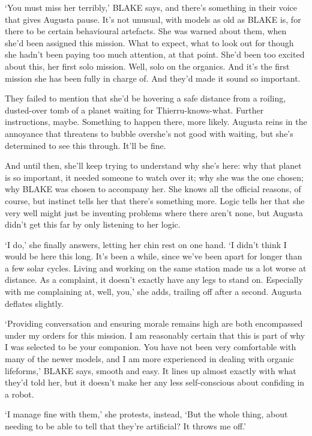 `You must miss her terribly,' BLAKE says, and there's something in
their voice that gives Augusta pause. It's not unusual, with models as
old as BLAKE is, for there to be certain behavioural artefacts. She
was warned about them, when she'd been assigned this mission. What to
expect, what to look out for \textellipsis though she hadn't been
paying too much attention, at that point. She'd been too excited about
this, her first solo mission. Well, solo on the organics. And it's the
first mission she has been fully in charge of. And they'd made it
sound so important.

They failed to mention that she'd be hovering a safe distance from a
roiling, dusted-over tomb of a planet waiting for
Thierru-knows-what. Further instructions, maybe. Something to happen
there, more likely. Augusta reins in the annoyance that threatens to
bubble over\textemdash she's not good with waiting, but she's
determined to see this through. It'll be fine.

And until then, she'll keep trying to understand why she's here: why
that planet is so important, it needed someone to watch over it; why
she was the one chosen; why BLAKE was chosen to accompany her. She
knows all the official reasons, of course, but instinct tells her that
there's something more.  Logic tells her that she very well might just
be inventing problems where there aren't none, but Augusta didn't get
this far by only listening to her logic.

`I do,' she finally answers, letting her chin rest on one hand. `I
didn't think I would be here this long. It's been a while, since we've
been apart for longer than a few solar cycles. Living and working on
the same station made us a lot worse at distance. As a complaint, it
doesn't exactly have any legs to stand on. Especially with me
complaining at, well, you,' she adds, trailing off after a
second. Augusta deflates slightly.

`Providing conversation and ensuring morale remains high are both
encompassed under my orders for this mission. I am reasonably certain
that this is part of why I was selected to be your companion. You have
not been very comfortable with many of the newer models, and I am more
experienced in dealing with organic lifeforms,' BLAKE says, smooth and
easy. It lines up almost exactly with what they'd told her, but it
doesn't make her any less self-conscious about confiding in a robot.

`I manage fine with them,' she protests, instead, `But the
whole \textellipsis thing, about needing to be able to tell that
they're artificial? It throws me off.'

